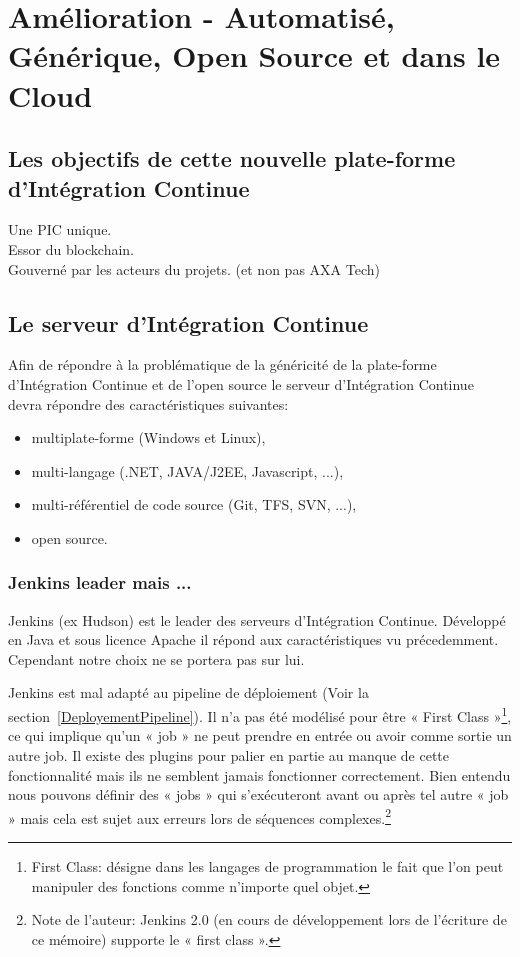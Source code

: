 \chapter{Amélioration - Automatisé, Générique, Open Source et dans le Cloud}

  \section{Les objectifs de cette nouvelle plate-forme d'Intégration Continue}
  Une PIC unique.\\
  Essor du blockchain.\\
  Gouverné par les acteurs du projets. (et non pas AXA Tech)\\

  \section{Le serveur d’Intégration Continue}
  Afin de répondre à la problématique de la généricité de la plate-forme d'Intégration Continue et de l'open source le serveur d'Intégration Continue devra répondre des caractéristiques suivantes:\\

  \begin{itemize}
    \item multiplate-forme (Windows et Linux),
    \item multi-langage (.NET, JAVA/J2EE, Javascript, ...),
    \item multi-référentiel de code source (Git, TFS, SVN, ...),
    \item open source.\\
  \end{itemize}

    \subsection{Jenkins leader mais ...}
    Jenkins (ex Hudson) est le leader des serveurs d'Intégration Continue. Développé en Java et sous licence Apache il répond aux caractéristiques vu précedemment. Cependant notre choix ne se portera pas sur lui.

    Jenkins est mal adapté au pipeline de déploiement (Voir la section~\ref{DeployementPipeline}). Il n’a pas été modélisé pour être « First Class »\footnote{First Class: désigne dans les langages de programmation le fait que l'on peut manipuler des fonctions comme n'importe quel objet.}, ce qui implique qu'un « job » ne peut prendre en entrée ou avoir comme sortie un autre job. Il existe des plugins pour palier en partie au manque de cette fonctionnalité mais ils ne semblent jamais fonctionner correctement. Bien entendu nous pouvons définir des « jobs » qui s’exécuteront avant ou après tel autre « job » mais cela est sujet aux erreurs lors de séquences complexes.\footnote{Note de l'auteur: Jenkins 2.0 (en cours de développement lors de l'écriture de ce mémoire) supporte le « first class ».}\\

